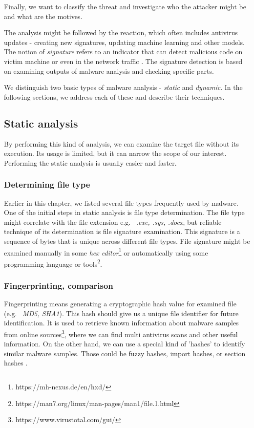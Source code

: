 Finally, we want to classify the threat and investigate who the attacker might be and what are the motives.

The analysis might be followed by the reaction, which often includes antivirus updates - creating new signatures, updating machine learning and other models. The notion of \emph{signature} refers to an indicator that can detect malicious code on victim machine or even in the network traffic \cite{Sikorski2012}. The signature detection is based on examining outputs of malware analysis and checking specific parts.

We distinguish two basic types of malware analysis - \emph{static} and \emph{dynamic}. In the following sections, we address each of these and describe their techniques.

\subsection{Static analysis}
By performing this kind of analysis, we can examine the target file without its execution. Its usage is limited, but it can narrow the scope of our interest. \cite{KA2018} Performing the static analysis is usually easier and faster. \cite{Sikorski2012}

\subsubsection*{Determining file type}
Earlier in this chapter, we listed several file types frequently used by malware. One of the initial steps in static analysis is file type determination. The file type might correlate with the file extension e.g. \ \emph{.exe, .sys, .docx}, but reliable technique of its determination is file signature examination. This signature is a sequence of bytes that is unique across different file types. File signature might be examined manually in some \emph{hex editor}\footnote{https://mh-nexus.de/en/hxd/} or automatically using some programming language or tools\footnote{https://man7.org/linux/man-pages/man1/file.1.html}. \cite{KA2018} 


\subsubsection*{Fingerprinting, comparison}
Fingerprinting means generating a cryptographic hash value for examined file (e.g. \ \emph{MD5, SHA1}). This hash should give us a unique file identifier for future identification. It is used to retrieve known information about malware samples from online sources\footnote{https://www.virustotal.com/gui/}, where we can find multi antivirus scans and other useful information. On the other hand, we can use a special kind of 'hashes' to identify similar malware samples. Those could be fuzzy hashes, import hashes, or section hashes \cite{KA2018}.

